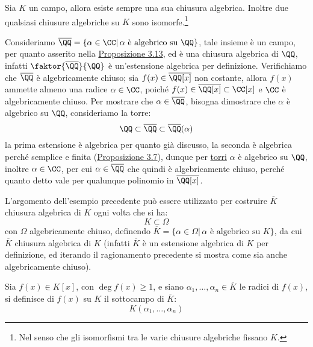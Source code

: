 \documentclass[11pt]{scrartcl}
\begin{document}
\begin{theorem}
    \label{3.25}
    Sia $K$ un campo, allora esiste sempre una sua chiusura algebrica. Inoltre due qualsiasi chiusure algebriche su $K$ sono isomorfe.\footnote{Nel senso che gli isomorfismi tra le varie chiusure algebriche fissano $K$.}
\end{theorem}

\begin{example}
    Consideriamo $\overline\QQ = \{\alpha \in \CC | \, \text{$\alpha$ è algebrico su $\QQ$}\}$, tale insieme è un campo, per quanto asserito nella
    \hyperref[3.13]{Proposizione 3.13}, ed è una chiusura algebrica di $\QQ$, infatti $\faktor{\overline\QQ}{\QQ}$ è un'estensione algebrica per definizione.
    Verifichiamo che $\overline\QQ$ è algebricamente chiuso; sia $f(x) \in \overline\QQ[x]$ non costante, allora $f(x)$ ammette almeno una radice $\alpha \in \CC$, poiché
    $f(x) \in \overline\QQ[x] \subset \CC[x]$ e $\CC$ è algebricamente chiuso. Per mostrare che $\alpha \in \overline\QQ$, bisogna
    dimostrare che $\alpha$ è algebrico su $\QQ$, consideriamo la torre:
    \[ \QQ \subset \overline \QQ \subset \overline\QQ (\alpha)
        \]
    la prima estensione è algebrica per quanto già discusso, la seconda è algebrica perché semplice e finita (\hyperref[3.7]{Proposizione 3.7}), dunque per \hyperref[torri]{torri} $\alpha$
    è algebrico su $\QQ$, inoltre $\alpha \in \CC$, per cui $\alpha \in \overline\QQ$ che quindi è algebricamente chiuso, perché quanto detto vale per qualunque polinomio in $\overline\QQ[x]$.
\end{example}

\begin{remark}
    L'argomento dell'esempio precedente può essere utilizzato per costruire $\overline K$ chiusura algebrica di $K$ ogni volta che si ha:
    \[ K \subset \Omega
        \]
    con $\Omega$ algebricamente chiuso, definendo $\overline K = \{\alpha \in \Omega |  \, \text{$\alpha$ è algebrico su $K$}\}$, da cui $\overline K$ chiusura algebrica di $K$ (infatti $\overline K$ è un estensione algebrica 
    di $K$ per definizione, ed iterando il ragionamento precedente si mostra come sia anche algebricamente chiuso).
\end{remark}

\begin{definition}
    Sia $f(x) \in K[x]$, con $\deg f(x) \geq 1$, e siano $\alpha_1,\ldots,\alpha_n \in \overline K$ le radici di $f(x)$, si definisce  di $f(x)$ su $K$ il sottocampo di $\overline K$:
    \[ K(\alpha_1,\ldots,\alpha_n)
        \]
\end{definition}
\end{document}
